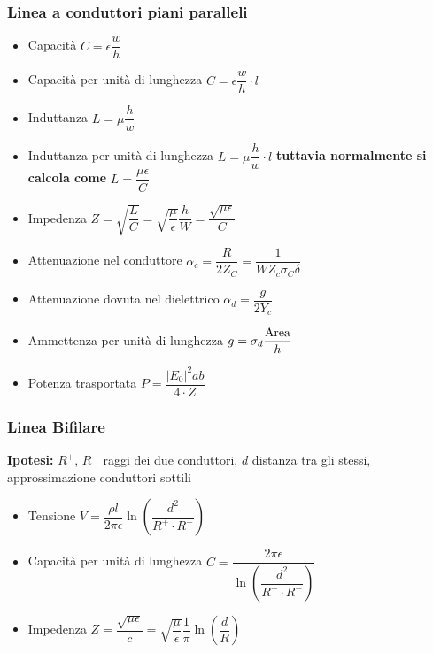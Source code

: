 \documentclass{article}
\begin{document}
\subsubsection{Linea a conduttori piani paralleli}
\begin{itemize}
	\item Capacità \( C = \epsilon \dfrac{w}{h} \)
	\item Capacità per unità di lunghezza \( C = \epsilon \dfrac{w}{h} \cdot l \)
	\item Induttanza \( L = \mu \dfrac{h}{w} \)
	\item Induttanza per unità di lunghezza \( L = \mu \dfrac{h}{w} \cdot l \) \textbf{tuttavia normalmente si calcola come} \( L = \dfrac{\mu \epsilon}{C} \)
	\item Impedenza \( Z = \sqrt{\dfrac{L}{C}} = \sqrt{\dfrac{\mu}{\epsilon}} \dfrac{h}{W} = \dfrac{\sqrt{\mu \epsilon}}{C} \)
	\item Attenuazione nel conduttore \( \alpha_c = \dfrac{R}{2 Z_C} = \dfrac{1}{W Z_c \sigma_C \delta} \)
	\item Attenuazione dovuta nel dielettrico \( \alpha_d = \dfrac{g}{2 Y_c} \)
	\item Ammettenza per unità di lunghezza \( g = \sigma_d \dfrac{\textnormal{Area}}{h}\)
	\item Potenza trasportata \( P = \dfrac{|E_0|^2 a b}{4 \cdot Z} \)
\end{itemize}

\subsubsection{Linea Bifilare}
\textbf{Ipotesi:} \(R^+\), \(R^-\) raggi dei due conduttori, \(d\) distanza tra gli stessi, approssimazione conduttori sottili
\begin{itemize}
	\item Tensione \(V = \dfrac{\rho l}{2 \pi \epsilon} \ln \left( \dfrac{d^2}{R^+ \cdot R^-}\right) \)
	\item Capacità per unità di lunghezza \( C = \dfrac{2 \pi \epsilon}{\ln \left( \dfrac{d^2}{R^+ \cdot R^-}\right)} \)
	\item Impedenza \( Z = \dfrac{\sqrt{\mu \epsilon}}{c} = \sqrt{\dfrac{\mu}{\epsilon}} \dfrac{1}{\pi} \ln \left( \dfrac{d}{R} \right) \)
\end{itemize}
\end{document}
